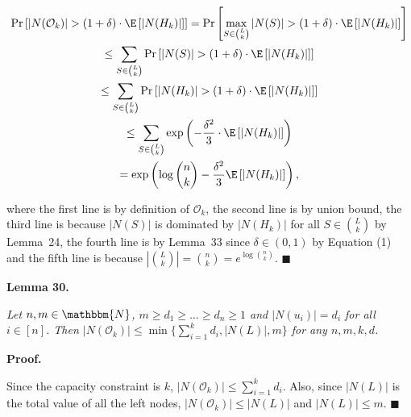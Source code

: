 \[\begin{gathered}
\displaystyle\Pr\left[|N(\mathcal{O}_{k})|>(1+\delta)\cdot\E\left[|N(H_{k})|\right]\right] \displaystyle=\Pr\left[\max_{S\in\binom{L}{k}}|N(S)|>(1+\delta)\cdot\E\left[|N(H_{k})|\right]\right] \\
\displaystyle\leq\sum_{S\in\binom{L}{k}}\Pr\left[|N(S)|>(1+\delta)\cdot\E\left[|N(H_{k})|\right]\right] \\
\displaystyle\leq\sum_{S\in\binom{L}{k}}\Pr\left[|N(H_{k})|>(1+\delta)\cdot\E\left[|N(H_{k})|\right]\right] \\
\displaystyle\leq\sum_{S\in\binom{L}{k}}\exp\left(-\frac{\delta^{2}}{3}\cdot\E\left[|N(H_{k})|\right]\right) \\
\displaystyle=\exp\left(\log{\binom{n}{k}}-\frac{\delta^{2}}{3}\E\left[|N(H_{k})|\right]\right),
\end{gathered}\]


where the first line is by definition of $\mathcal{O}_{k}$, the second line is by union bound, the third line is because $|N(S)|$ is dominated by $|N(H_{k})|$ for all $S\in\binom{L}{k}$ by Lemma 24, the fourth line is by Lemma 33 since $\delta\in(0,1)$ by Equation (1) and the fifth line is because $|\binom{L}{k}|=\binom{n}{k}=e^{\log{\binom{n}{k}}}$.
\ensuremath{\blacksquare}\par






\par\medskip\noindent\textbf{\textbf{Lemma 30}\textbf{.}}\par



\emph{Let $n,m\in\mathbbm{N}$, $m\geq d_{1}\geq\dots\geq d_{n}\geq 1$ and $|N(u_{i})|=d_{i}$ for all $i\in[n]$. Then $|N(\mathcal{O}_{k})|\leq\min\{\sum_{i=1}^{k}{d_{i}},|N(L)|,m\}$ for any $n,m,k,d$.}\par






\par\medskip\noindent\textbf{Proof.}\par



Since the capacity constraint is $k$, $|N(\mathcal{O}_{k})|\leq\sum_{i=1}^{k}d_{i}$.
Also, since $|N(L)|$ is the total value of all the left nodes, $|N(\mathcal{O}_{k})|\leq|N(L)|$ and $|N(L)|\leq m$.
\ensuremath{\blacksquare}\par





